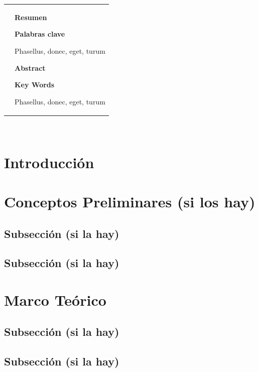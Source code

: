 \documentclass[12pt, twoside]{article} %
\begin{document}
\begin{titlepage}
\begin{tabular}{p{4.5cm} p{11cm}}
&
\textbf{Resumen}
\par\medskip
\lipsum[2] %
\vspace{1cm}
\textbf{Palabras clave}
\par\medskip
Phasellus, donec, eget, turum %
\par\medskip
\vspace{1cm}
\textbf{Abstract}
\par\medskip
\lipsum[2] %
\vspace{1cm}
\textbf{Key Words}
\par\medskip
Phasellus, donec, eget, turum %
\end{tabular}
\end{titlepage}

\tableofcontents
$\ $

\newpage
\section{Introducción}
\lipsum[1] %
\lipsum[2] %

\newpage
\section{Conceptos Preliminares (si los hay)}
\lipsum[1] %
\subsection{Subsección (si la hay)}
\lipsum %
\subsection{Subsección (si la hay)}
\lipsum %

\newpage
\section{Marco Teórico}
\lipsum[1] %
\subsection{Subsección (si la hay)}
\lipsum %
\subsection{Subsección (si la hay)}
\lipsum %
\end{document}
